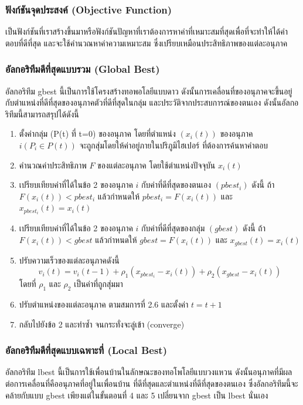 \subsubsection{ฟังก์ชันจุดประสงค์ (Objective Function)}
เป็นฟังก์ชันที่เราสร้างขึ้นมาหรือฟังก์ชันปัญหาที่เราต้องการหาค่าที่เหมาะสมที่สุดเพื่อที่จะทำให้ได้คำตอบที่ดีที่สุด และจะใช้คำนวณหาค่าความเหมาะสม ซึ่งเปรียบเหมือนประสิทธิภาพของแต่ละอนุภาค

\subsubsection{อัลกอริทึมดีที่สุดแบบรวม (Global Best)}
อัลกอริทึม gbest นี้เป็นการใช้โครงสร้างทอพอโลยีแบบดาว ดังนั้นการเคลื่อนที่ของอนุภาคจะขึ้นอยู่กับตำแหน่งที่ดีที่สุดของอนุภาคตัวที่ดีที่สุดในกลุ่ม และประวัติจากประสบการณ์ของตนเอง ดังนั้นอัลกอริทึมนี้สามารถสรุปได้ดังนี้
\begin{enumerate}
\item ตั้งค่ากลุ่ม (P(t) ที่ t=0) ของอนุภาค โดยที่ตำแหน่ง \((x_{i}(t))\) ของอนุภาค \(i (P_{i} \in P(t))\) จะถูกสุ่มโดยให้ค่าอยู่ภายในปริภูมิไฮเปอร์ ที่ต้องการค้นหาคำตอบ
\item คำนวณค่าประสิทธิภาพ \(F\) ของแต่ละอนุภาค โดยใช้ตำแหน่งปัจจุบัน \(x_{i}(t)\)
\item เปรียบเทียบค่าที่ได้ในข้อ 2 ของอนุภาค \(i\) กับค่าที่ดีที่สุดของตนเอง \((pbest_{i})\) ดังนี้ ถ้า \(F(x_{i}(t)) < pbest_{i}\) แล้วกำหนดให้ \(pbest_{i} = F(x_{i}(t))\) และ \(x_{pbest_{i}}(t) = x_{i}(t)\)
\item เปรียบเทียบค่าที่ได้ในข้อ 2 ของอนุภาค \(i\) กับค่าที่ดีที่สุดของกลุ่ม \((gbest)\) ดังนี้ ถ้า \(F(x_{i}(t)) < gbest\) แล้วกำหนดให้ \(gbest = F(x_{i}(t))\) และ \(x_{gbest}(t) = x_{i}(t)\)
\item ปรับความเร็วของแต่ละอนุภาคดังนี้ \begin{equation}
  v_{i}(t) = v_{i}(t-1) + \rho_{1}(x_{pbest_{i}} - x_{i}(t)) + \rho_{2}(x_{gbest} - x_{i}(t))
\end{equation} โดยที่ \(\rho_{1}\) และ \(\rho_{2}\) เป็นค่าที่ถูกสุ่มมา
\item ปรับตำแหน่งของแต่ละอนุภาค ตามสมการที่ 2.6 และตั้งค่า \(t = t+1\)
\item กลับไปยังข้อ 2 และทำซ้ำ จนกระทั่งจะลู่เข้า (converge)
\end{enumerate}

\subsubsection{อัลกอริทึมดีที่สุดแบบเฉพาะที่ (Local Best)}
อัลกอริทึม lbest นี้เป็นการใช้เพื่อนบ้านในลักษณะของทอโพโลยีแบบวงแหวน ดังนั้นอนุภาคที่มีผลต่อการเคลื่อนที่คืออนุภาคที่อยู่ในเพื่อนบ้าน ที่ดีที่สุดและตำแหน่งที่ดีที่สุดของตนเอง ซึ่งอัลกอริทึมนี้จะคล้ายกับแบบ gbest เพียงแต่ในขั้นตอนที่ 4 และ 5 เปลี่ยนจาก gbest เป็น lbest นั่นเอง

